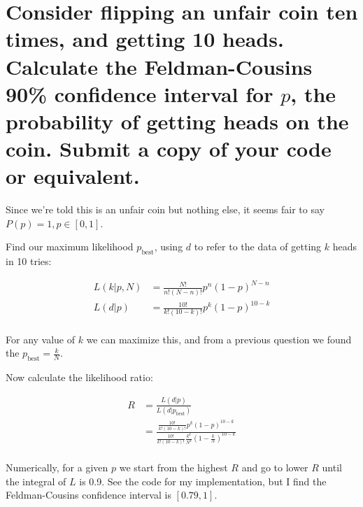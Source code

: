 \section{Consider flipping an unfair coin ten times, and getting 10 heads. Calculate the Feldman-Cousins 90\% confidence interval for \texorpdfstring{$p$}{p}, the probability of getting heads on the coin. Submit a copy of your code or equivalent.}

Since we're told this is an unfair coin but nothing else, it seems fair to say $P(p)=1, p \in [0,1]$.

Find our maximum likelihood $p_{\text{best}}$, using $d$ to refer to the data of getting $k$ heads in 10 tries:

\begin{align*}
    L(k|p, N) &= \frac{N!}{n!(N-n)!} p^{n}(1-p)^{N-n} \\
    L(d|p) &= \frac{10!}{k!(10-k)!} p^{k}(1-p)^{10-k} \\
\end{align*}

For any value of $k$ we can maximize this, and from a previous question we found the $p_{\text{best}} = \frac{k}{N}$.

Now calculate the likelihood ratio:

\begin{align*}
    R &= \frac{L(d|p)}{L(d|p_{\text{best}})} \\
    &= \frac{\frac{10!}{k!(10-k)!} p^{k}(1-p)^{10-k}}{\frac{10!}{k!(10-k)!} \frac{k^k}{N^k}\left(1-\frac{k}{N}\right)^{10-k}} \\
\end{align*}

Numerically, for a given $p$ we start from the highest $R$ and go to lower $R$ until the integral of $L$ is 0.9. See the code for my implementation, but I find the Feldman-Cousins confidence interval is $[0.79, 1]$.
